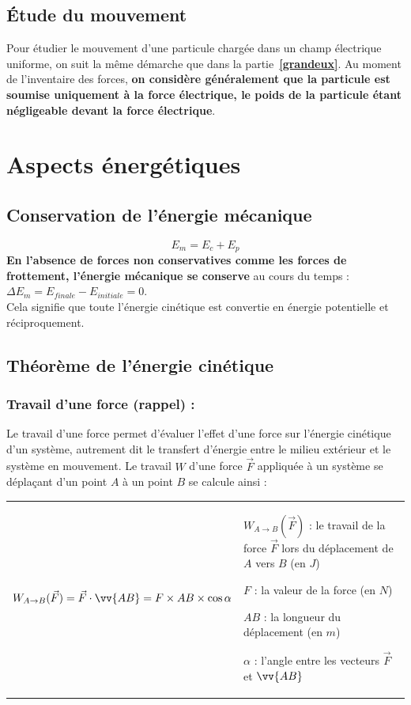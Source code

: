 \documentclass[a4paper,12pt,fleqn]{article}%
\begin{document}
	\subsection{Étude du mouvement}
Pour étudier le mouvement d'une particule chargée dans un champ électrique uniforme, on suit la même démarche que dans la partie~\textbf{\ref{grandeux}}. Au moment de l'inventaire des forces, \textbf{on considère généralement que la particule est soumise uniquement à la force électrique, le poids de la particule étant négligeable devant la force électrique}.

\section{Aspects énergétiques}

	\subsection{Conservation de l'énergie mécanique}
	$$E_m = E_c + E_p $$
	\textbf{En l'absence de forces non conservatives comme les forces de frottement, l'énergie mécanique se conserve} au cours du temps : $\Delta E_m = E_{finale} -E_{initiale} = 0$.\\
	Cela signifie que toute l'énergie cinétique est convertie en énergie potentielle et réciproquement.
	
	\subsection{Théorème de l'énergie cinétique}
		\subsubsection*{Travail d'une force (rappel) :}
		Le travail d'une force permet d'évaluer l'effet d'une force sur l'énergie cinétique d'un système, autrement dit le transfert d'énergie entre le milieu extérieur et le système en mouvement. Le travail $W$ d'une force $\vec{F}$ appliquée à un système se déplaçant d'un point $A$ à un point $B$ se calcule ainsi :\\
		\begin{tabular}{>{\centering}m{8cm} |>{\centering\arraybackslash}m{10cm}}
		$$W_{A \rightarrow B}(\vec{F}) = \vec{F} \cdot \vv{AB} = F \times AB \times \cos \alpha$$& \begin{itemize**}
		\item $W_{A \rightarrow B}(\vec{F})$ : le travail de la force $\vec{F}$ lors du déplacement de $A$ vers $B$ (en $J$)
		\item $F$ : la valeur de la force (en $N$)
		\item $AB$ : la longueur du déplacement (en $m$)
		\item $\alpha$ : l'angle entre les vecteurs $\vec{F}$ et $\vv{AB}$ \end{itemize**} \\
		\end{tabular}
		
\end{document}
